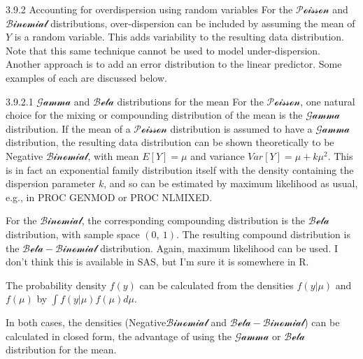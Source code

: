 \documentclass[
  9pt,
  ignorenonframetext,
]{beamer}
\begin{document}
\begin{frame}{3.9.2 Accounting for overdispersion using random
variables}
\protect\hypertarget{accounting-for-overdispersion-using-random-variables}{}
For the \(\mathcal {Poisson}\) and\(\mathcal {Binomial}\) distributions,
over-dispersion can be included by assuming the mean of \(Y\) is a
random variable. This adds variability to the resulting data
distribution. Note that this same technique cannot be used to model
under-dispersion. Another approach is to add an error distribution to
the linear predictor. Some examples of each are discussed below.
\end{frame}

\begin{frame}{}
\protect\hypertarget{section-9}{}
\begin{block}{3.9.2.1 \(\mathcal {Gamma}\) and \(\mathcal {Beta}\)
distributions for the mean}
\protect\hypertarget{mathcal-gamma-and-mathcal-beta-distributions-for-the-mean}{}
For the \(\mathcal {Poisson}\), one natural choice for the mixing or
compounding distribution of the mean is the \(\mathcal {Gamma}\)
distribution. If the mean of a \(\mathcal {Poisson}\) distribution is
assumed to have a \(\mathcal {Gamma}\) distribution, the resulting data
distribution can be shown theoretically to be Negative
\(\mathcal {Binomial}\), with mean \(E[Y]=\mu\) and variance
\(Var[Y]=\mu+k\mu^2\). This is in fact an exponential family
distribution itself with the density containing the dispersion parameter
\(k\), and so can be estimated by maximum likelihood as usual, e.g., in
PROC GENMOD or PROC NLMIXED.

For the \(\mathcal {Binomial}\), the corresponding compounding
distribution is the \(\mathcal {Beta}\) distribution, with sample space
\((0,\ 1)\). The resulting compound distribution is the
\(\mathcal {Beta-Binomial}\) distribution. Again, maximum likelihood can
be used. I don't think this is available in SAS, but I'm sure it is
somewhere in R.

The probability density \(f(y)\) can be calculated from the densities
\(f(y|\mu)\) and \(f(\mu)\) by \(\int f(y|\mu)f(\mu)d\mu\).

In both cases, the densities (Negative\(\mathcal {Binomial}\) and
\(\mathcal {Beta-Binomial}\)) can be calculated in closed form, the
advantage of using the \(\mathcal {Gamma}\) or \(\mathcal {Beta}\)
distribution for the mean.
\end{block}
\end{frame}
\end{document}
